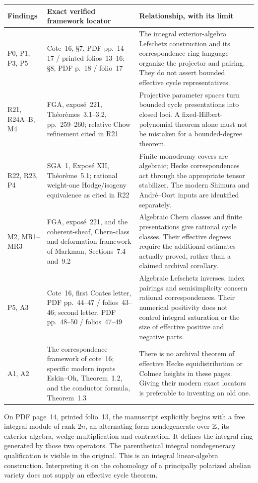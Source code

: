 \begin{longtable}{p{27mm}p{45mm}p{76mm}}
\toprule
Findings & Exact verified framework locator & Relationship, with its limit\\
\midrule
\endhead
P0, P1, P3, P5 & Cote~16, \S7, PDF pp.~14--17 / printed folios~13--16; \S8, PDF p.~18 / folio~17 & The integral exterior-algebra Lefschetz construction and its correspondence-ring language organize the projector and pairing. They do not assert bounded effective cycle representatives.\\
R21, R24A--B, M4 & FGA, expos\'e~221, Th\'eor\`emes~3.1--3.2, pp.~259--260; relative Chow refinement cited in R21 & Projective parameter spaces turn bounded cycle presentations into closed loci. A fixed-Hilbert-polynomial theorem alone must not be mistaken for a bounded-degree theorem.\\
R22, R23, P4 & SGA~1, Expos\'e XII, Th\'eor\`eme~5.1; rational weight-one Hodge/isogeny equivalence as cited in R22 & Finite monodromy covers are algebraic; Hecke correspondences act through the appropriate tensor stabilizer. The modern Shimura and Andr\'e--Oort inputs are identified separately.\\
M2, MR1--MR3 & FGA, expos\'e~221, and the coherent-sheaf, Chern-class and deformation framework of Markman, Sections~7.4 and~9.2 & Algebraic Chern classes and finite presentations give rational cycle classes. Their effective degrees require the additional estimates actually proved, rather than a claimed archival corollary.\\
P5, A3 & Cote~16, first Coates letter, PDF pp.~44--47 / folios~43--46; second letter, PDF pp.~48--50 / folios~47--49 & Algebraic Lefschetz inverses, index pairings and semisimplicity concern rational correspondences. Their numerical positivity does not control integral saturation or the size of effective positive and negative parts.\\
A1, A2 & The correspondence framework of cote~16; specific modern inputs Eskin--Oh, Theorem~1.2, and the conductor formula, Theorem~1.3 & There is no archival theorem of effective Hecke equidistribution or Colmez heights in these pages. Giving their modern exact locators is preferable to inventing an old one.\\
\bottomrule
\end{longtable}

On PDF page~14, printed folio~13, the manuscript explicitly begins with a free integral module of rank $2n$, an alternating form nondegenerate over $\mathbb Z$, its exterior algebra, wedge multiplication and contraction. It defines the integral ring generated by those two operators. The parenthetical integral nondegeneracy qualification is visible in the original. This is an integral linear-algebra construction. Interpreting it on the cohomology of a principally polarized abelian variety does not supply an effective cycle theorem.

